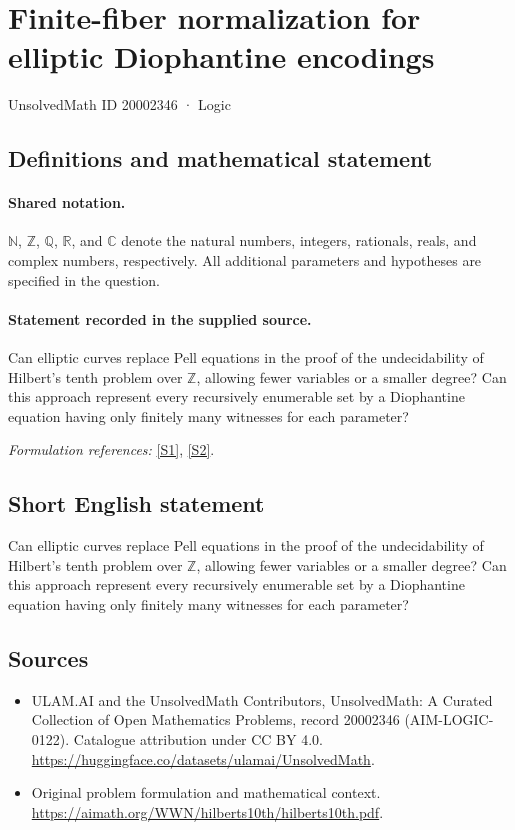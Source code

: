 \documentclass[11pt]{article}
\newcommand{\sref}[2]{\hyperlink{source:#1:#2}{[S#2]}}
\begin{document}
\setcounter{section}{20002345}
\section{Finite-fiber normalization for elliptic Diophantine encodings}\label{20002346}
{\small UnsolvedMath ID 20002346 · Logic}
\subsection{Definitions and mathematical statement}

\paragraph{Shared notation.}$\mathbb N$, $\mathbb Z$, $\mathbb Q$, $\mathbb R$, and $\mathbb C$ denote the natural numbers, integers, rationals, reals, and complex numbers, respectively. All additional parameters and hypotheses are specified in the question.


\paragraph{Statement recorded in the supplied source.}
Can elliptic curves replace Pell equations in the proof of the undecidability of Hilbert's tenth problem over $\mathbb Z$, allowing fewer variables or a smaller degree? Can this approach represent every recursively enumerable set by a Diophantine equation having only finitely many witnesses for each parameter?
\par\smallskip\textit{Formulation references:} \sref{20002346}{1}, \sref{20002346}{2}.
\subsection{Short English statement}
Can elliptic curves replace Pell equations in the proof of the undecidability of Hilbert's tenth problem over $\mathbb Z$, allowing fewer variables or a smaller degree? Can this approach represent every recursively enumerable set by a Diophantine equation having only finitely many witnesses for each parameter?
\subsection{Sources}
\begin{itemize}
\item[\hypertarget{source:20002346:1}{S1}] ULAM.AI and the UnsolvedMath Contributors, UnsolvedMath: A Curated Collection of Open Mathematics Problems, record 20002346 (AIM-LOGIC-0122). Catalogue attribution under CC BY 4.0.
\url{https://huggingface.co/datasets/ulamai/UnsolvedMath}.
\item[\hypertarget{source:20002346:2}{S2}] Original problem formulation and mathematical context.
\url{https://aimath.org/WWN/hilberts10th/hilberts10th.pdf}.
\end{itemize}
\label{end:20002346}
\end{document}
